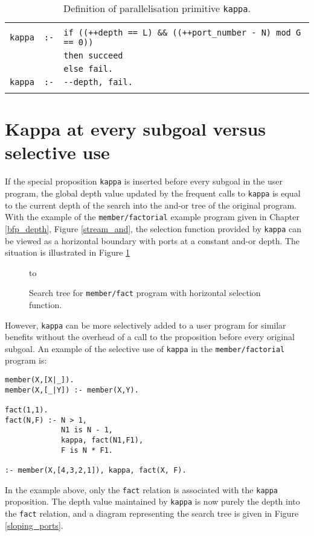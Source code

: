 \begin{table}[htbp]
{\small
\begin{tabular}{| l l l |}
\hline
& & \\
\verb?kappa? & \verb?:-? & \verb?if ((++depth == L) && ((++port_number - N) mod G == 0))? \\
 & & \verb?then succeed? \\
 & & \verb?else fail.? \\
\verb?kappa? & \verb?:-?  & \verb?--depth, fail.?\\
 & & \\
\hline
\end{tabular}
}
\caption{Definition of parallelisation primitive \texttt{kappa}.}
\label{kappa_code}
\end{table}


\section{Kappa at every subgoal versus selective use} %

If the special proposition \texttt{kappa} is inserted before every subgoal in
the user program, the global depth value updated by the frequent calls to
\texttt{kappa} is equal to the current depth of the search into the and-or
tree of the original program.  With the example of the \texttt{member/factorial}
example program given in
Chapter \ref{bfp_depth}, Figure \ref{stream_and}, the selection function provided by
\texttt{kappa} can be viewed as a horizontal boundary with ports at a constant
and-or depth.  The situation is illustrated in Figure \ref{horiz_ports}

\begin{figure}[htbp]
\vspace{5mm} \hbox to 
\caption{Search tree for \texttt{member/fact} program with horizontal selection function.}
\vspace{5mm}
\label{horiz_ports}
\end{figure}

However, \texttt{kappa} can be more selectively added to a user program for
similar benefits without the overhead of a call to the proposition before
every original subgoal.  An example of the selective use of \texttt{kappa}
in the \texttt{member/factorial} program is:
\begin{verbatim}
member(X,[X|_]).
member(X,[_|Y]) :- member(X,Y).

fact(1,1).
fact(N,F) :- N > 1,
             N1 is N - 1,
             kappa, fact(N1,F1),
             F is N * F1.
             
:- member(X,[4,3,2,1]), kappa, fact(X, F).
\end{verbatim}
In the example above, only the \texttt{fact} relation is associated with
the \texttt{kappa} proposition.  The depth value maintained by \texttt{kappa}
is now purely the depth into the \texttt{fact} relation, and a diagram
representing the search tree is given in Figure \ref{sloping_ports}.

